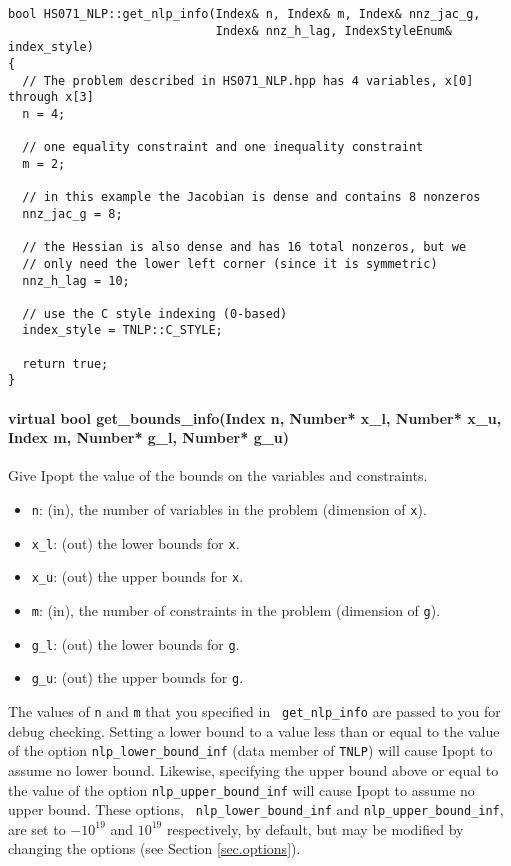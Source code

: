 \documentclass[letter,10pt]{article}
\begin{document}
{\begin{verbatim}
bool HS071_NLP::get_nlp_info(Index& n, Index& m, Index& nnz_jac_g, 
                             Index& nnz_h_lag, IndexStyleEnum& index_style)
{
  // The problem described in HS071_NLP.hpp has 4 variables, x[0] through x[3]
  n = 4;

  // one equality constraint and one inequality constraint
  m = 2;

  // in this example the Jacobian is dense and contains 8 nonzeros
  nnz_jac_g = 8;

  // the Hessian is also dense and has 16 total nonzeros, but we
  // only need the lower left corner (since it is symmetric)
  nnz_h_lag = 10;

  // use the C style indexing (0-based)
  index_style = TNLP::C_STYLE;

  return true;
}
\end{verbatim}

\paragraph{virtual bool get\_bounds\_info(Index n, Number* x\_l, Number* x\_u, \\
                            Index m, Number* g\_l, Number* g\_u)} 
$\;$ \\
Give Ipopt the value of the bounds on the variables and constraints.
\begin{itemize}
\item {\tt n}: (in), the number of variables in the problem (dimension of {\tt x}). 
\item {\tt x\_l}: (out) the lower bounds for {\tt x}. 
\item {\tt x\_u}: (out) the upper bounds for {\tt x}.
\item {\tt m}: (in), the number of constraints in the problem (dimension of {\tt g}).
\item {\tt g\_l}: (out) the lower bounds for {\tt g}. 
\item {\tt g\_u}: (out) the upper bounds for {\tt g}.
\end{itemize}
The values of {\tt n} and {\tt m} that you specified in {\tt
  get\_nlp\_info} are passed to you for debug checking.  Setting a
lower bound to a value less than or equal to the value of the option
{\tt nlp\_lower\_bound\_inf} (data member of {\tt TNLP}) will cause
Ipopt to assume no lower bound. Likewise, specifying the upper bound
above or equal to the value of the option {\tt nlp\_upper\_bound\_inf}
will cause Ipopt to assume no upper bound.  These options, {\tt
  nlp\_lower\_bound\_inf} and {\tt nlp\_upper\_bound\_inf}, are set to
$-10^{19}$ and $10^{19}$ respectively, by default, but may be modified
by changing the options (see Section \ref{sec.options}).

}
\end{document}
